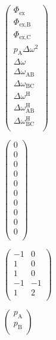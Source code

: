\documentclass[a4paper,11pt,twoside,openright]{book}
\def\lthtmlcheckvsize{\ifdim\ht\sizebox<\vsize 
  \ifdim\wd\sizebox<\hsize\expandafter\hfill\fi \expandafter\vfill
  \else\expandafter\vss\fi}%
\begin{document}
{\newpage\clearpage
{}%
$\displaystyle \begin{pmatrix}
\Phi_{\textrm{ex}}\\
\Phi_{\textrm{ex,B}}\\
\Phi_{\textrm{ex,C}}\\
p_{\textrm{A}}\Delta\omega ^2 \\
\Delta\omega \\
\Delta\omega_{\textrm{AB}}\\
\Delta\omega_{\textrm{BC}}\\
\Delta\omega^{\scriptscriptstyle\mathrm{H}}\\
\Delta\omega^{\scriptscriptstyle\mathrm{H}}_{\textrm{AB}}\\
\Delta\omega^{\scriptscriptstyle\mathrm{H}}_{\textrm{BC}}\\
\end{pmatrix}$%
\lthtmlindisplaymathZ
\lthtmlcheckvsize\clearpage}

{\newpage\clearpage
{}%
$\displaystyle \begin{pmatrix}
0 \\
0 \\
0 \\
0 \\
0 \\
0 \\
0 \\
0 \\
0 \\
0 \\
\end{pmatrix}$%
\lthtmlindisplaymathZ
\lthtmlcheckvsize\clearpage}

{\newpage\clearpage
{}%
$\displaystyle \begin{pmatrix}
-1 & 0 \\
1 & 0 \\
1 & 0 \\
-1 &-1 \\
1 & 2 \\
\end{pmatrix}$%
\lthtmlindisplaymathZ
\lthtmlcheckvsize\clearpage}

{\newpage\clearpage
{}%
$\displaystyle \begin{pmatrix}
p_{\textrm{A}}\\
p_{\textrm{B}}\\
\end{pmatrix}$%
\lthtmlindisplaymathZ
\lthtmlcheckvsize\clearpage}
\end{document}
